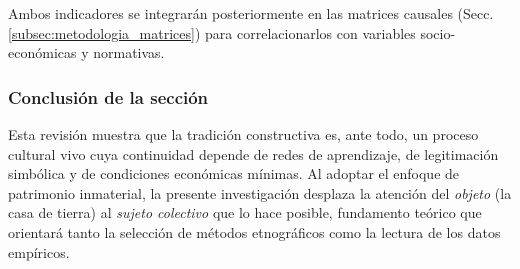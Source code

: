 Ambos indicadores se integrarán posteriormente en las matrices causales
(Secc.\,\ref{subsec:metodologia_matrices}) para correlacionarlos con
variables socio-económicas y normativas.

\subsubsection{Conclusión de la sección}

Esta revisión muestra que la tradición constructiva es,
ante todo, un proceso cultural vivo cuya continuidad depende de redes de
aprendizaje, de legitimación simbólica y de condiciones económicas
mínimas.  Al adoptar el enfoque de patrimonio inmaterial, la presente
investigación desplaza la atención del \emph{objeto} (la casa de tierra)
al \emph{sujeto colectivo} que lo hace posible, fundamento teórico que
orientará tanto la selección de métodos etnográficos como la lectura de
los datos empíricos.
